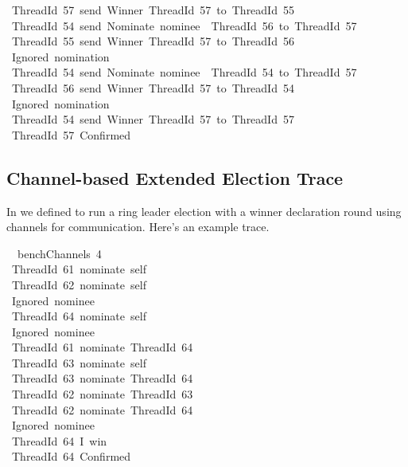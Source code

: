 \documentclass[sigplan,screen]{acmart}
\begin{document}
\begin{tabbing}
\ttfamily ~ThreadId~57~send~Winner~ThreadId~57~to~ThreadId~55\\
\ttfamily ~ThreadId~54~send~Nominate~nominee~~ThreadId~56~to~ThreadId~57\\
\ttfamily ~ThreadId~55~send~Winner~ThreadId~57~to~ThreadId~56\\
\ttfamily ~Ignored~nomination\\
\ttfamily ~ThreadId~54~send~Nominate~nominee~~ThreadId~54~to~ThreadId~57\\
\ttfamily ~ThreadId~56~send~Winner~ThreadId~57~to~ThreadId~54\\
\ttfamily ~Ignored~nomination\\
\ttfamily ~ThreadId~54~send~Winner~ThreadId~57~to~ThreadId~57\\
\ttfamily ~ThreadId~57~Confirmed
\end{tabbing}

\normalsize







\subsection{Channel-based Extended Election Trace}
\label{apx:benchChannels-trace}

In  we defined  to run a ring
leader election with a winner declaration round using channels for
communication.
%
Here's an example trace.

\scriptsize

\begin{tabbing}\ttfamily
~~benchChannels~4\\
\ttfamily ~ThreadId~61~nominate~self\\
\ttfamily ~ThreadId~62~nominate~self\\
\ttfamily ~Ignored~nominee\\
\ttfamily ~ThreadId~64~nominate~self\\
\ttfamily ~Ignored~nominee\\
\ttfamily ~ThreadId~61~nominate~ThreadId~64\\
\ttfamily ~ThreadId~63~nominate~self\\
\ttfamily ~ThreadId~63~nominate~ThreadId~64\\
\ttfamily ~ThreadId~62~nominate~ThreadId~63\\
\ttfamily ~ThreadId~62~nominate~ThreadId~64\\
\ttfamily ~Ignored~nominee\\
\ttfamily ~ThreadId~64~I~win\\
\ttfamily ~ThreadId~64~Confirmed
\end{tabbing}
\end{document}
